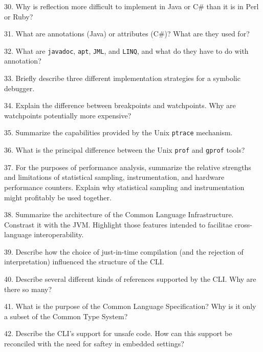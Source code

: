 30. Why is reflection more difficult to implement in Java or C$\#$ than it is in Perl or Ruby?

\filbreak
\vskip 1cm

31. What are annotations (Java) or attributes (C$\#$)? What are they used for?

\filbreak
\vskip 1cm

32. What are {\tt javadoc}, {\tt apt}, {\tt JML}, and {\tt LINQ}, and what do they have to do with annotation?

\filbreak
\vskip 1cm

33. Briefly describe three different implementation strategies for a symbolic debugger.

\filbreak
\vskip 1cm

34. Explain the difference between breakpoints and watchpoints. Why are watchpoints potentially more expensive?

\filbreak
\vskip 1cm

35. Summarize the capabilities provided by the Unix {\tt ptrace} mechanism.

\filbreak
\vskip 1cm

36. What is the principal difference between the Unix {\tt prof} and {\tt gprof} tools?

\filbreak
\vskip 1cm

37. For the purposes of performance analysis, summarize the relative strengths and limitations of statistical sampling, instrumentation, and hardware performance counters. Explain why statistical sampling and instrumentation might profitably be used together.

\filbreak
\vskip 1cm

38. Summarize the architecture of the Common Language Infrastructure. Constrast it with the JVM. Highlight those features intended to facilitae cross-language interoperability.

\filbreak
\vskip 1cm

39. Describe how the choice of just-in-time compilation (and the rejection of interpretation) influenced the structure of the CLI.

\filbreak
\vskip 1cm

40. Describe several different kinds of references supported by the CLI. Why are there so many?

\filbreak
\vskip 1cm

41. What is the purpose of the Common Language Specification? Why is it only a subset of the Common Type System?

\filbreak
\vskip 1cm

42. Describe the CLI's support for unsafe code. How can this support be reconciled with the need for saftey in embedded settings?
\filbreak
\vfill\eject
\bye
